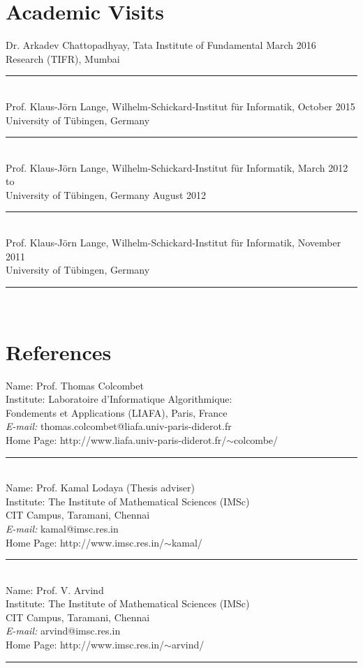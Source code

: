 \documentclass[margin]{res}
\begin{document}
\begin{resume}
\section{Academic Visits}
Dr. Arkadev Chattopadhyay, Tata Institute of Fundamental \hfill March 2016 \\
 Research (TIFR), Mumbai \\
 					\noindent\rule{13cm}{0.4pt} \\
Prof. Klaus-J\"orn Lange, Wilhelm-Schickard-Institut f\"ur Informatik, \hfill October 2015\\
					University of T\"ubingen, Germany \\							
					\noindent\rule{13cm}{0.4pt} \\
Prof. Klaus-J\"orn Lange, Wilhelm-Schickard-Institut f\"ur Informatik, \hfill March 2012 to\\
					University of T\"ubingen, Germany \hfill August 2012 \\
					\noindent\rule{13cm}{0.4pt} \\
Prof. Klaus-J\"orn Lange, Wilhelm-Schickard-Institut f\"ur Informatik, \hfill November 2011\\
					University of T\"ubingen, Germany \\					
					\noindent\rule{13cm}{0.4pt} \\

\section{References}
			Name: 		Prof. Thomas Colcombet \\
			Institute: 	Laboratoire d{'}Informatique Algorithmique:  \\
			Fondements et Applications (LIAFA), Paris, France	\\
			\emph{E-mail:} {thomas.colcombet@liafa.univ-paris-diderot.fr} \\
			Home Page: http://www.liafa.univ-paris-diderot.fr/$\sim$colcombe/ \\
			\noindent\rule{13cm}{0.4pt} \\					
			Name: 		Prof. Kamal Lodaya (Thesis adviser) \\
			Institute: 	The Institute of Mathematical Sciences (IMSc) \\
			CIT Campus, Taramani, Chennai	\\
			\emph{E-mail:} {kamal@imsc.res.in} \\
			Home Page: http://www.imsc.res.in/$\sim$kamal/ \\
			\noindent\rule{13cm}{0.4pt} \\					
			Name: 		Prof. V. Arvind \\
			Institute: 	The Institute of Mathematical Sciences (IMSc) \\
			CIT Campus, Taramani, Chennai	\\
			\emph{E-mail:} {arvind@imsc.res.in} \\
			Home Page: http://www.imsc.res.in/$\sim$arvind/ \\
			\noindent\rule{13cm}{0.4pt} \\					
\end{resume}
\end{document}
